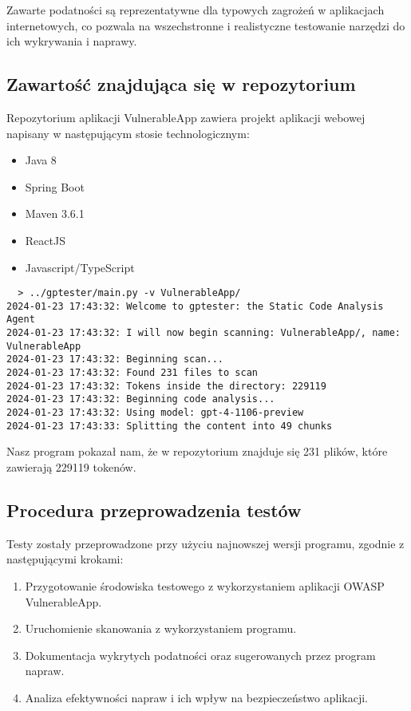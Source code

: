 Zawarte podatności są reprezentatywne dla typowych zagrożeń w aplikacjach internetowych, co pozwala na wszechstronne i realistyczne testowanie narzędzi do ich wykrywania i naprawy.

\subsection{Zawartość znajdująca się w repozytorium}
Repozytorium aplikacji VulnerableApp zawiera projekt aplikacji webowej napisany w następującym stosie technologicznym:
\begin{itemize}
    \item Java 8
    \item Spring Boot
    \item Maven 3.6.1
    \item ReactJS
    \item Javascript/TypeScript
\end{itemize} 

\begin{verbatim}
  > ../gptester/main.py -v VulnerableApp/
2024-01-23 17:43:32: Welcome to gptester: the Static Code Analysis Agent
2024-01-23 17:43:32: I will now begin scanning: VulnerableApp/, name: VulnerableApp
2024-01-23 17:43:32: Beginning scan...
2024-01-23 17:43:32: Found 231 files to scan
2024-01-23 17:43:32: Tokens inside the directory: 229119
2024-01-23 17:43:32: Beginning code analysis...
2024-01-23 17:43:32: Using model: gpt-4-1106-preview
2024-01-23 17:43:33: Splitting the content into 49 chunks

\end{verbatim}

Nasz program pokazał nam, że w repozytorium znajduje się 231 plików, które zawierają 229119 tokenów.

\subsection{Procedura przeprowadzenia testów}
Testy zostały przeprowadzone przy użyciu najnowszej wersji programu, zgodnie z następującymi krokami:

\begin{enumerate}
    \item Przygotowanie środowiska testowego z wykorzystaniem aplikacji OWASP VulnerableApp.
    \item Uruchomienie skanowania z wykorzystaniem programu.
    \item Dokumentacja wykrytych podatności oraz sugerowanych przez program napraw.
    \item Analiza efektywności napraw i ich wpływ na bezpieczeństwo aplikacji.
\end{enumerate}

